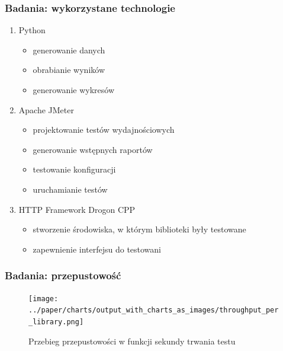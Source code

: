 \documentclass[12pt]{beamer}
\begin{document}
	\begin{frame}
		\frametitle{Badania: wykorzystane technologie}

		\begin{enumerate}
			\item Python
			\begin{itemize}
				\item generowanie danych
				\item obrabianie wyników
				\item generowanie wykresów
			\end{itemize}
			\item Apache JMeter\texttrademark
			\begin{itemize}
				\item projektowanie testów wydajnościowych
				\item generowanie wstępnych raportów
				\item testowanie konfiguracji
				\item uruchamianie testów
			\end{itemize}
			\item HTTP Framework Drogon CPP
			\begin{itemize}
				\item stworzenie środowiska, w którym biblioteki były testowane
				\item zapewnienie interfejsu do testowani
			\end{itemize}
		\end{enumerate}
	\end{frame}

	\begin{frame}
		\frametitle{Badania: przepustowość}

		\begin{figure}[ht!]
			\centering
			\texttt{[image: ../paper/charts/output\_with\_charts\_as\_images/throughput\_per\_library.png]}
			\caption{Przebieg przepustowości w funkcji sekundy trwania testu}
		\end{figure}

	\end{frame}
\end{document}
